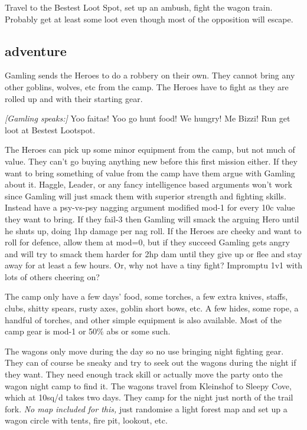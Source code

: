 Travel to the Bestest Loot Spot, set up an ambush, fight the wagon train. Probably get at least some loot even though most of the opposition will escape.


\subsection*{adventure}

Gamling sends the Heroes to do a robbery on their own. They cannot bring any other goblins, wolves, etc from the camp. The Heroes have to fight as they are rolled up and with their starting gear.

\begin{readoutloud}
\emph{[Gamling speaks:]}
Yoo faitas! Yoo go hunt food! We hungry! Me Bizzi! Run get loot at Bestest Lootspot.
\end{readoutloud}

\noindent The Heroes can pick up some minor equipment from the camp, but not much of value. They can't go buying anything new before this first mission either. If they want to bring something of value from the camp have them argue with Gamling about it. Haggle, Leader, or any fancy intelligence based arguments won't work since Gamling will just smack them with superior strength and fighting skills. Instead have a psy-vs-psy nagging argument modified mod-1 for every 10c value they want to bring. If they fail-3 then Gamling will smack the arguing Hero until he shuts up, doing 1hp damage per nag roll. If the Heroes are cheeky and want to roll for defence, allow them at mod=0, but if they succeed Gamling gets angry and will try to smack them harder for 2hp dam until they give up or flee and stay away for at least a few hours. Or, why not have a tiny fight? Impromptu 1v1 with lots of others cheering on?

The camp only have a few days' food, some torches, a few extra knives, staffs, clubs, shitty spears, rusty axes, goblin short bows, etc. A few hides, some rope, a handful of torches, and other simple equipment is also available. Most of the camp gear is mod-1 or 50\% abs or some such.

The wagons only move during the day so no use bringing night fighting gear. They can of course be sneaky and try to seek out the wagons during the night if they want. They need enough track skill or actually move the party onto the wagon night camp to find it. The wagons travel from Kleinshof to Sleepy Cove, which at 10sq/d takes two days. They camp for the night just north of the trail fork. \emph{No map included for this,} just randomise a light forest map and set up a wagon circle with tents, fire pit, lookout, etc.

